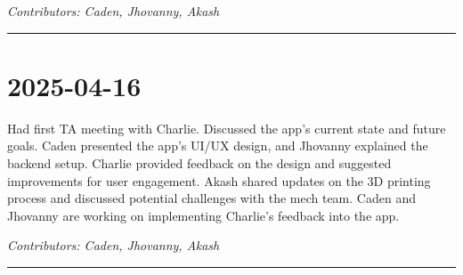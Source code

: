 \documentclass[12pt]{article}
\begin{document}
\vspace{1em}
\noindent\textit{Contributors: Caden, Jhovanny, Akash}
\vspace{1em}
\hrule

\section*{2025-04-16}
Had first TA meeting with Charlie. Discussed the app's current state and future goals. Caden presented the app's UI/UX design, and Jhovanny explained the backend setup. Charlie provided feedback on the design and suggested improvements for user engagement. Akash shared updates on the 3D printing process and discussed potential challenges with the mech team.
Caden and Jhovanny are working on implementing Charlie's feedback into the app. 

\vspace{1em}
\noindent\textit{Contributors: Caden, Jhovanny, Akash}
\vspace{1em}
\hrule
\end{document}
